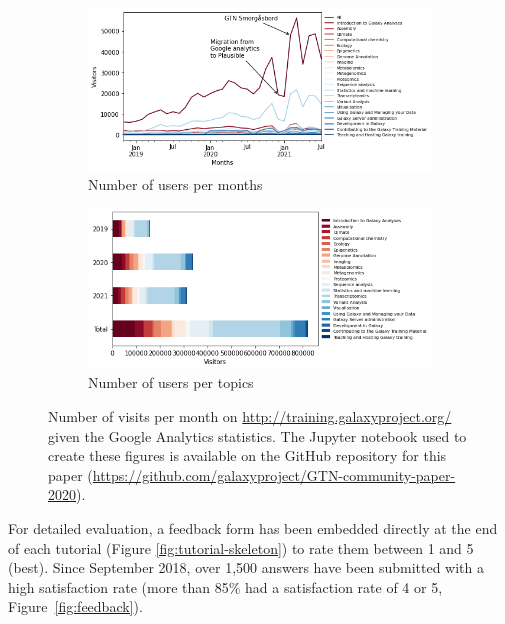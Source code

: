 \documentclass[10pt,letterpaper]{article}
\begin{document}
\begin{figure}[!ht]
    \centering
    \begin{subfigure}[b]{0.45\textwidth}
         \centering
         \includegraphics[width=\textwidth]{images/analytics-all-users.png}
         \caption{Number of users per months}
         \label{fig:analytics-all-users}
    \end{subfigure}
    \hfill
    \begin{subfigure}[b]{0.45\textwidth}
         \centering
         \includegraphics[width=\textwidth]{images/analytics-topics-users.png}
         \caption{Number of users per topics}
         \label{fig:analytics-topics-users}
    \end{subfigure}
	\caption{Number of visits per month on \url{http://training.galaxyproject.org/} given the Google Analytics statistics. The Jupyter notebook used to create these figures is available on the GitHub repository for this paper (\url{https://github.com/galaxyproject/GTN-community-paper-2020}).}
	\label{fig:visits}
\end{figure}

For detailed evaluation, a feedback form has been embedded directly at the end of each tutorial (Figure \ref{fig:tutorial-skeleton}) to rate them between 1 and 5 (best). Since September 2018, over 1,500 answers have been submitted with a high satisfaction rate (more than 85\% had a satisfaction rate of 4 or 5, Figure~\ref{fig:feedback}).
\end{document}
